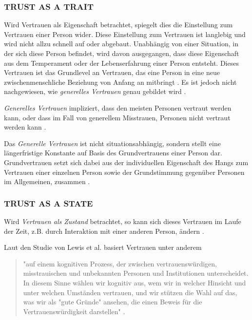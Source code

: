 \documentclass[sigchi]{acmart}
\begin{document}
\subsubsection{TRUST AS A TRAIT }
Wird Vertrauen als Eigenschaft betrachtet, spiegelt dies die Einstellung zum Vertrauen einer Person wider. Diese Einstellung zum Vertrauen ist langlebig und wird nicht allzu schnell auf oder abgebaut. Unabhängig von einer Situation, in der sich diese Person befindet, wird davon ausgegangen, dass diese Eigenschaft aus dem Temperament oder der Lebenserfahrung einer Person entsteht. Dieses Vertrauen ist das Grundlevel an Vertrauen, das eine Person in eine neue zwischenmenschliche Beziehung von Anfang an mitbringt \citep[S. 11]{couch1996assessment}. Es ist jedoch nicht nachgewiesen, wie \textit{generelles Vertrauen} genau gebildet wird \citep[S. 409]{stolle2002trusting}.

\textit{Generelles Vertrauen} impliziert, dass den meisten Personen vertraut werden kann, oder dass im Fall von generellem Misstrauen, Personen nicht vertraut werden kann \citep[S. 409]{stolle2002trusting}.

Das \textit{Generelle Vertrauen} ist nicht situationsabhängig, sondern stellt eine längerfristige Konstante auf Basis des Grundvertrauens einer Person dar. Grundvertrauen setzt sich dabei aus der individuellen Eigenschaft des Hangs zum Vertrauen einer einzelnen Person sowie der Grundstimmung gegenüber Personen im Allgemeinen, zusammen \citep[S. 11]{couch1996assessment}.

\subsubsection{TRUST AS A STATE}

Wird \textit{Vertrauen als Zustand} betrachtet, so kann sich dieses Vertrauen im Laufe der Zeit, z.B. durch Interaktion mit einer anderen Person, ändern \citep[S. 712]{mayer1995integrative}.

Laut den Studie von Lewis et al. \citep[S. 970-971]{lewis1985trust} basiert Vertrauen unter anderem 
\begin{quote}
"auf einem kognitiven Prozess, der zwischen vertrauenswürdigen, misstrauischen und unbekannten Personen und Institutionen unterscheidet. In diesem Sinne wählen wir kognitiv aus, wem wir in welcher Hinsicht und unter welchen Umständen vertrauen, und wir stützen die Wahl auf das, was wir als "gute Gründe" ansehen, die einen Beweis für die Vertrauenswürdigkeit darstellen" \citep[S. 970]{lewis1985trust}.
\end{quote}
\end{document}
